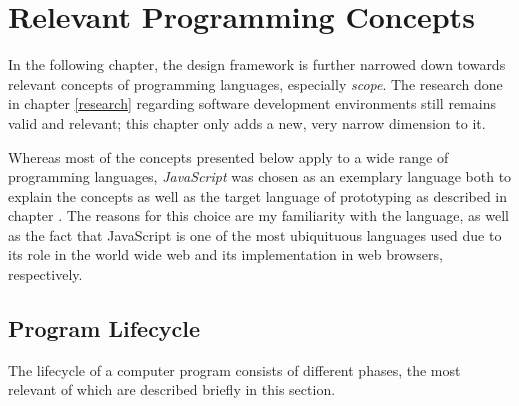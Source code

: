 \chapter{Relevant Programming Concepts}\label{concepts}

In the following chapter, the design framework is further narrowed down
towards relevant concepts of programming languages, especially
\emph{scope}. The research done in chapter \ref{research} regarding
software development environments still remains valid and relevant; this
chapter only adds a new, very narrow dimension to it.

Whereas most of the concepts presented below apply to a wide range of
programming languages, \emph{JavaScript} was chosen as an exemplary
language both to explain the concepts as well as the target language of
prototyping as described in chapter . The reasons for
this choice are my familiarity with the language, as well as the fact
that JavaScript is one of the most ubiquituous languages used due to its
role in the world wide web and its implementation in web browsers,
respectively.

\section{Program Lifecycle}\label{program-lifecycle}

The lifecycle of a computer program consists of different phases, the
most relevant of which are described briefly in this section.

